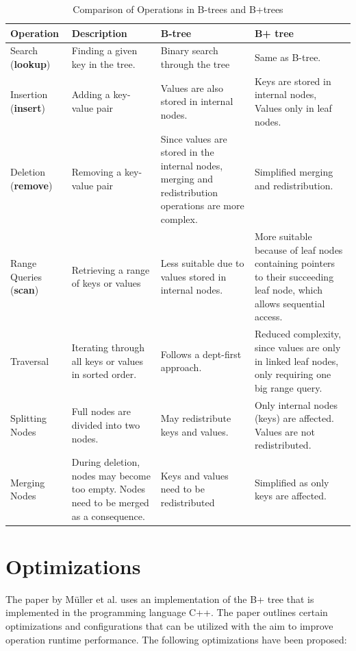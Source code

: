 \begin{table}[htbp]
\centering

\begin{tabular}{|p{2cm}|p{3cm}|p{4cm}|p{4cm}|}
\hline
\textbf{Operation} & \textbf{Description} & \textbf{B-tree} & \textbf{B+ tree} \\
\hline
Search (\textbf{lookup}) & Finding a given key in the tree. & Binary search through the tree & Same as B-tree. \\
\hline
Insertion (\textbf{insert}) & Adding a key-value pair & Values are also stored in internal nodes. & Keys are stored in internal nodes, Values only in leaf nodes. \\
\hline
Deletion (\textbf{remove}) & Removing a key-value pair & Since values are stored in the internal nodes, merging and redistribution operations are more complex. & Simplified merging and redistribution. \\
\hline
Range Queries (\textbf{scan}) & Retrieving a range of keys or values & Less suitable due to values stored in internal nodes. & More suitable because of leaf nodes containing pointers to their succeeding leaf node, which allows sequential access. \\
\hline
Traversal & Iterating through all keys or values in sorted order. & Follows a dept-first approach. & Reduced complexity, since values are only in linked leaf nodes, only requiring one big range query.  \\
\hline
Splitting Nodes & Full nodes are divided into two nodes. & May redistribute keys and values. & Only internal nodes (keys) are affected. Values are not redistributed.  \\
\hline
Merging Nodes & During deletion, nodes may become too empty. Nodes need to be merged as a consequence. & Keys and values need to be redistributed & Simplified as only keys are affected. \\
\hline
\end{tabular}
\caption{Comparison of Operations in B-trees and B+trees}
\label{fig:operationstable}
\end{table}



\section{Optimizations}

The paper by Müller et al. \parencite{mueller2024} uses an implementation of the B+ tree that is implemented in the programming language C++. The paper outlines certain optimizations and configurations that can be utilized with the aim to improve operation runtime performance. The following optimizations have been proposed: 

